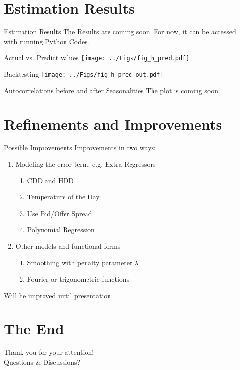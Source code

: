 \documentclass{beamer}
\begin{document}
\section{Estimation Results}

\begin{frame}{Estimation Results}
    The Results are coming soon. For now, it can be accessed with running Python Codes.
\end{frame}


\begin{frame}{Actual vs. Predict values}
    \texttt{[image: ../Figs/fig\_h\_pred.pdf]}
\end{frame}


\begin{frame}{Backtesting}
    \texttt{[image: ../Figs/fig\_h\_pred\_out.pdf]}
\end{frame}



\begin{frame}{Autocorrelations before and after Seasonalities}
    The plot is coming soon
\end{frame}


\section{Refinements and Improvements}

\begin{frame}{Possible Improvements}
    Improvements in two ways:
    \begin{enumerate}[label=(\roman*)]
        \item Modeling the error term: e.g. Extra Regressors
              \begin{enumerate}
                  \item CDD and HDD
                  \item Temperature of the Day
                  \item Use Bid/Offer Spread
                  \item Polynomial Regression
              \end{enumerate}

        \item Other models and functional forms
              \begin{enumerate}
                  \item Smoothing with penalty parameter $\lambda$
                  \item Fourier or trigonometric functions
              \end{enumerate}
    \end{enumerate}

    Will be improved until presentation
\end{frame}


\section{The End}

\begin{frame}
    \centering
    \Huge
    Thank you for your attention! \\[0.5cm] Questions \& Discussions?
\end{frame}

\nocite{*}

\end{document}
